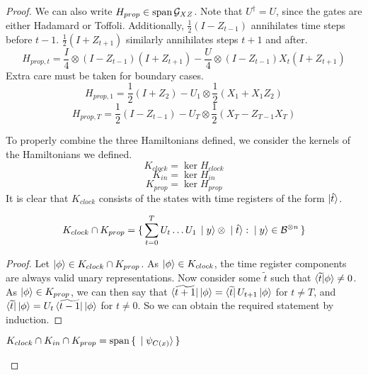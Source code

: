 \begin{proof}
	We can also write $H_{prop}\in\operatorname*{\operatorname{span}}\mathcal{G}_{XZ}$. Note that $U^\dagger=U$, since the gates are either Hadamard or Toffoli. Additionally, $\frac{1}{2}(I-Z_{t-1})$ annihilates time steps before $t-1$. $\frac{1}{2}(I+Z_{t+1})$ similarly annihilates steps $t+1$ and after.
	$$H_{prop,t}=\frac{I}{4}\otimes(I-Z_{t-1})(I+Z_{t+1})-\frac{U}{4}\otimes(I-Z_{t-1})X_t(I+Z_{t+1})$$
	Extra care must be taken for boundary cases.
	$$H_{prop,1}=\frac{1}{2}(I+Z_2)-U_1\otimes\frac{1}{2}(X_1+X_1Z_2)$$
	$$H_{prop,T}=\frac{1}{2}(I-Z_{t-1})-U_T\otimes\frac{1}{2}(X_T-Z_{T-1}X_T)$$

	To properly combine the three Hamiltonians defined, we consider the kernels of the Hamiltonians we defined.
	$$K_{clock}=\ker H_{clock}$$
	$$K_{in}=\ker H_{in}$$
	$$K_{prop}=\ker H_{prop}$$
	It is clear that $K_{clock}$ consists of the states with time registers of the form $\ket{\hat{t}}$.

	\begin{lemma} 
		$$K_{clock}\cap K_{prop}=\set{\sum_{t=0}^TU_t\ldots U_1\ket{y}\otimes\ket{\hat{t}}: \ket{y}\in\mathcal{B}^{\otimes n}}$$
	\end{lemma}

	\begin{proof}
		Let $\ket\phi\in K_{clock}\cap K_{prop}$. As $\ket\phi\in K_{clock}$, the time register components are always valid unary representations. Now consider some $\widetilde{t}$ such that $\braket{\widetilde{t}|\phi}\ne0$. As $\ket\phi\in K_{prop}$, we can then say that $\bra{\widetilde{t+1}}\ket\phi=\bra{\widetilde{t}}U_{t+1}\ket\phi$ for $t\ne T$, and $\bra{\widetilde{t}}\ket\phi=U_t\bra{\widetilde{t-1}}\ket\phi$ for $t\ne0$. So we can obtain the required statement by induction.
	\end{proof}

	\begin{corollary}
		$K_{clock}\cap K_{in}\cap K_{prop}=\operatorname*{\operatorname{span}}\set{\ket{\psi_{C(x)}}}$
	\end{corollary}


\end{proof}
